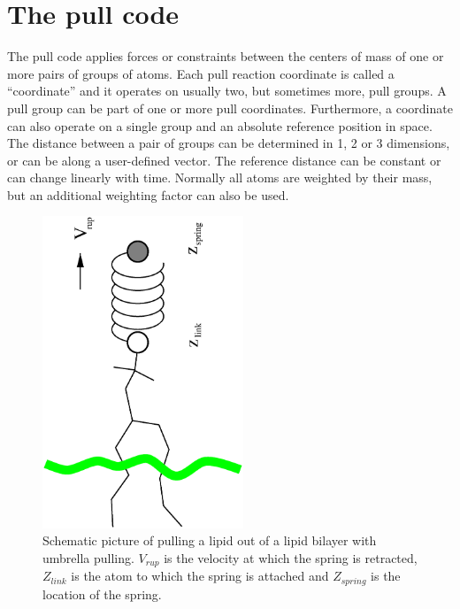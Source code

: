 \section{The pull code}
\label{sec:pull}
The pull code applies forces or constraints between the centers
of mass of one or more pairs of groups of atoms.
Each pull reaction coordinate is called a ``coordinate'' and it operates
on usually two, but sometimes more, pull groups. A pull group can be part of one or more pull
coordinates. Furthermore, a coordinate can also operate on a single group
and an absolute reference position in space.
The distance between a pair of groups can be determined
in 1, 2 or 3 dimensions, or can be along a user-defined vector.
The reference distance can be constant or can change linearly with time.
Normally all atoms are weighted by their mass, but an additional
weighting factor can also be used.
\begin{figure}
\centerline{\includegraphics[width=6cm,angle=270]{plots/pull}}
\caption{Schematic picture of pulling a lipid out of a lipid bilayer
with umbrella pulling. $V_{rup}$ is the velocity at which the spring is
retracted, $Z_{link}$ is the atom to which the spring is attached and
$Z_{spring}$ is the location of the spring.}
\label{fig:pull} 
\end{figure}


